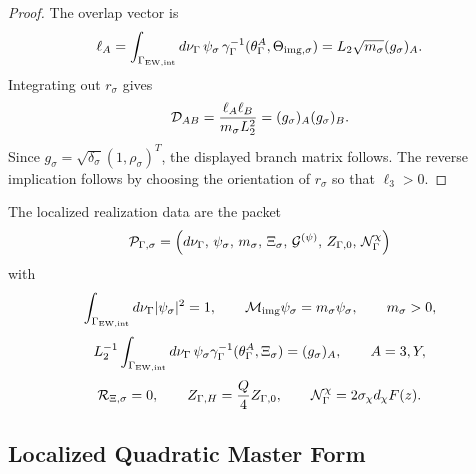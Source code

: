 \documentclass[11pt]{article}
\theoremstyle{definition}
\theoremstyle{remark}
\begin{document}
\begin{proof}
The overlap vector is
\[
  \ell_A
  =
  \int_{\Gamma_{\rm EW,int}}d\nu_\Gamma\,
  \psi_\sigma\,
  \gamma_\Gamma^{-1}(\theta_\Gamma^A,\Theta_{{\rm img},\sigma})
  =
  L_2\sqrt{m_\sigma}(g_\sigma)_A .
\]
Integrating out \(r_\sigma\) gives
\[
  {\cal D}_{AB}
  =
  \frac{\ell_A\ell_B}{m_\sigma L_2^2}
  =
  (g_\sigma)_A(g_\sigma)_B .
\]
Since \(g_\sigma=\sqrt{\delta_\sigma}(1,\rho_\sigma)^T\), the displayed branch
matrix follows.  The reverse implication follows by choosing the orientation of
\(r_\sigma\) so that \(\ell_3>0\).
\end{proof}

The localized realization data are the packet
\[
  {\cal P}_{\Gamma,\sigma}
  =
  \left(
  d\nu_\Gamma,\,
  \psi_\sigma,\,
  m_\sigma,\,
  \Xi_\sigma,\,
  {\cal G}^{(\psi)},\,
  Z_{\Gamma,0},\,
  {\cal N}_\Gamma^\chi
  \right)
\]
with
\[
  \int_{\Gamma_{\rm EW,int}}d\nu_\Gamma|\psi_\sigma|^2=1,
  \qquad
  {\cal M}_{\rm img}\psi_\sigma=m_\sigma\psi_\sigma,
  \qquad
  m_\sigma>0,
\]
\[
  L_2^{-1}
  \int_{\Gamma_{\rm EW,int}}d\nu_\Gamma\,
  \psi_\sigma
  \gamma_\Gamma^{-1}(\theta_\Gamma^A,\Xi_\sigma)
  =
  (g_\sigma)_A,
  \qquad A=3,Y,
\]
\[
  {\cal R}_{\Xi,\sigma}=0,
  \qquad
  Z_{\Gamma,H}=\frac Q4Z_{\Gamma,0},
  \qquad
  {\cal N}_\Gamma^\chi=2\sigma_\chi d_\chi F(z).
\]

\subsection{Localized Quadratic Master Form}
\end{document}
